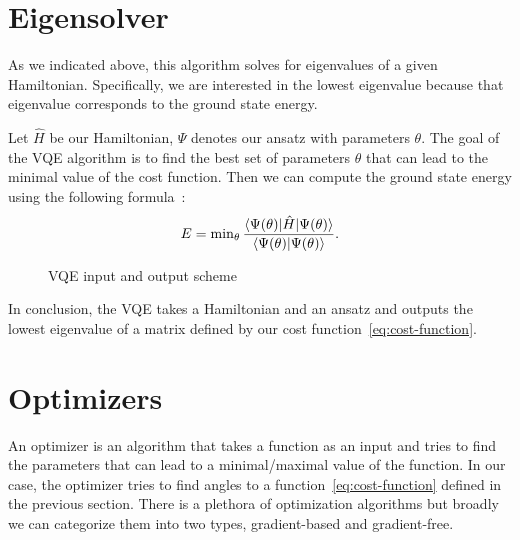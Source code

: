 \section{Eigensolver}
As we indicated above, this algorithm solves for eigenvalues of a given Hamiltonian. Specifically, we are interested in the lowest eigenvalue because that eigenvalue corresponds to the ground state energy. 

Let $\hat{H}$ be our Hamiltonian, $\Psi$ denotes our ansatz with parameters $\theta$. The goal of the VQE algorithm is to find the best set of parameters $\theta$ that can lead to the minimal value of the cost function. Then we can compute the ground state energy using the following formula~\cite{vqe_method}:
\begin{equation} \label{eq:cost-function}
E = \min\nolimits_{\theta} \frac{\langle\Psi(\theta)\rvert\hat{H}\lvert\Psi(\theta)\rangle}{\langle\Psi(\theta)\vert\Psi(\theta)\rangle} \text{.}
\end{equation}

\begin{figure}[H] 
    \caption{VQE input and output scheme}
\end{figure}

In conclusion, the VQE takes a Hamiltonian and an ansatz and outputs the lowest eigenvalue of a matrix defined by our cost function~\ref{eq:cost-function}.

\section{Optimizers}
An optimizer is an algorithm that takes a function as an input and tries to find the parameters that can lead to a minimal/maximal value of the function. In our case, the optimizer tries to find angles to a function~\ref{eq:cost-function} defined in the previous section. There is a plethora of optimization algorithms but broadly we can categorize them into two types, gradient-based and gradient-free.

